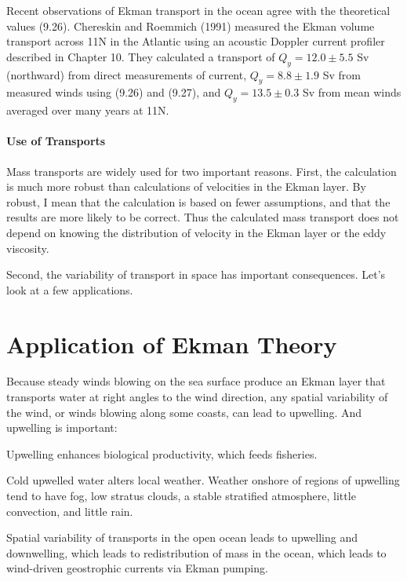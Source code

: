 Recent observations of Ekman transport in the ocean agree with the theoretical values
(9.26). Chereskin and Roemmich (1991) measured the Ekman volume
transport across 11\degrees N in the Atlantic using an acoustic
Doppler current profiler described in Chapter 10. They calculated a
transport of $Q_y = 12.0 \pm 5.5$ Sv (northward) from direct
measurements of current, $Q_y = 8.8 \pm 1.9$ Sv from measured winds
using (9.26) and (9.27), and $Q_y = 13.5 \pm 0.3$ Sv from mean winds
averaged over many years at 11\degrees N.

\paragraph{Use of Transports}
Mass transports are
widely used for two important reasons. First, the calculation is much
more robust than calculations of velocities in the Ekman layer. By
robust, I mean that the calculation is based on fewer assumptions, and
that the results are more likely to be correct. Thus the calculated
mass transport does not depend on knowing the distribution of velocity
in the Ekman layer or the eddy viscosity.

Second, the variability of transport in space has important
consequences. Let's look at a few applications.

\section{Application of Ekman Theory}

Because steady winds blowing on the sea surface produce an Ekman layer
that transports water at right
angles to the wind direction, any spatial variability of the wind, or
winds blowing along some coasts, can lead to
upwelling. And
upwelling is important:
\begin{enumerate}
\vitem Upwelling enhances biological productivity, which feeds
fisheries.
  
\vitem Cold upwelled water alters local weather. Weather onshore of
regions of upwelling tend to
have fog, low stratus clouds, a stable stratified atmosphere, little
convection, and little rain.

\vitem Spatial variability of transports in the open ocean leads to
upwelling and downwelling, which
leads to redistribution of mass in the ocean, which leads to
wind-driven geostrophic currents via Ekman pumping.
\end{enumerate}

